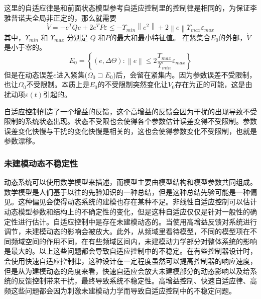 这里的自适应律是和前面状态模型参考自适应控制里的控制律是相同的，为保证李雅普诺夫全局非正定的，那么就需要
\begin{equation}
 \dot V =  - {e^T}Qe + 2e^{T}P\varepsilon \leq - \Upsilon_{min} \left \|e^2  \right \|  +2 \left \|e \right \| \Upsilon_{max} \varepsilon_{max}
\end{equation}
其中，$\Upsilon_{min}$ 和 $\Upsilon_{max}$ 分别是 $Q$ 和$P$的最大和最小特征值。
在紧集合$E_{0}$的外部，$\dot V$ 是小于零的。
\begin{equation}
E_0 = \left \{   (e,\Delta {\Theta } ):    \left \| e \right \| \leq 2 \frac{\Upsilon_{max}}{\Upsilon_{min}}  \varepsilon_{max}  \right \}
\end{equation}
但是在动态误差$e$进入紧集($\Omega_0 \sqsupset E_0$)后，会留在紧集内。因为参数误差不受限制，也让$\Omega_0$不受限制。本质上是$E_0$的不受限制突然变化让$V_{0}$存在为正的可能，这是由扰动项$\varepsilon(t)$引起的。

自适应控制创造了一个增益的反馈，这个高增益的反馈会因为干扰的出现导致不受限制的系统状态出现。状态不受限也会使得各个参数估计误差变得不受限制。参数误差变化快慢与干扰的变化快慢是相关的，这也会使得参数变化不受限制，也就是参数漂移。


\subsubsection{未建模动态不稳定性 }

动态系统可以使用数学模型来描述，而模型主要由模型结构和模型参数共同组成。数学模型是人们基于以往的先验知识的一种总结，但是这种总结先验可能是一种偏见。这种偏见会使得动态系统的建模也存在某种不足。非线性自适应控制可以估计动态模型参数和结构上的不确定性的变化，但是这种自适应仅仅是针对一般性的确定性进行估计。自适应控制中是存在未建模动态的。当使用高增益反馈对系统进行调节，未建模动态的影响会被放大。此外，从频域里看待模型，不同的模型项在不同频域空间的作用不同，在有些频域区间内，未建模动力学部分对整体系统的影响是最大的。以上这些问题都会导致自适应控制中的不稳定。在有些控制器设计时，会使用快速自适应控制律，这种设计在一定程度虽然可以提高控制器的响应速度，但是从为建模动态的角度来看，快速自适应会放大未建模部分的动态影响以及给系统的反馈控制带来干扰，最终导致系统不稳定性。高增益控制、快速自适应律、高频这些问题都会因为刺激未建模动力学而导致自适应控制中的不稳定问题。






